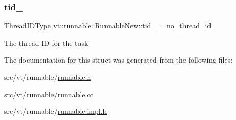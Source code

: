 \subsubsection{\texorpdfstring{tid\+\_\+}{tid\_}}
{\footnotesize\ttfamily \hyperlink{namespacevt_a9b887d814dd25ff495a0c8270304ac02}{Thread\+I\+D\+Type} vt\+::runnable\+::\+Runnable\+New\+::tid\+\_\+ = no\+\_\+thread\+\_\+id\hspace{0.3cm}{\ttfamily [private]}}

The thread ID for the task 

The documentation for this struct was generated from the following files\+:\begin{DoxyCompactItemize}
\item 
src/vt/runnable/\hyperlink{runnable_8h}{runnable.\+h}\item 
src/vt/runnable/\hyperlink{runnable_8cc}{runnable.\+cc}\item 
src/vt/runnable/\hyperlink{runnable_8impl_8h}{runnable.\+impl.\+h}\end{DoxyCompactItemize}
